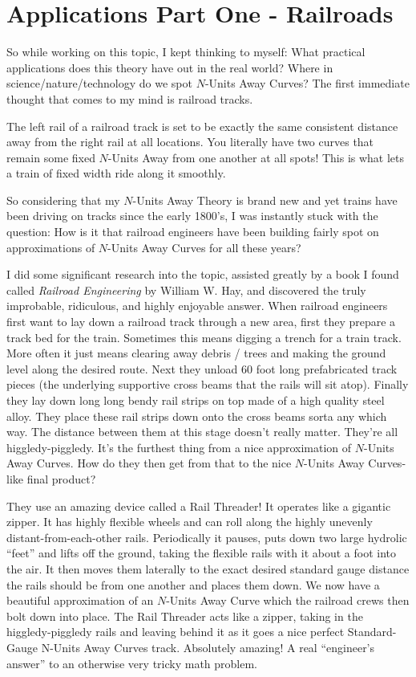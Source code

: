 \section{Applications Part One - Railroads}

So while working on this topic, I kept thinking to myself: What practical applications does this theory have out in the real world? Where in science/nature/technology do we spot $N$-Units Away Curves? The first immediate thought that comes to my mind is railroad tracks.

The left rail of a railroad track is set to be exactly the same consistent distance away from the right rail at all locations. You literally have two curves that remain some fixed $N$-Units Away from one another at all spots! This is what lets a train of fixed width ride along it smoothly.

So considering that my $N$-Units Away Theory is brand new and yet trains have been driving on tracks since the early 1800's, I was instantly stuck with the question: How is it that railroad engineers have been building fairly spot on approximations of $N$-Units Away Curves for all these years?

I did some significant research into the topic, assisted greatly by a book I found called \textit{Railroad Engineering} by William W. Hay, and discovered the truly improbable, ridiculous, and highly enjoyable answer. When railroad engineers first want to lay down a railroad track through a new area, first they prepare a track bed for the train. Sometimes this means digging a trench for a train track. More often it just means clearing away debris / trees and making the ground level along the desired route. Next they unload 60 foot long prefabricated track pieces (the underlying supportive cross beams that the rails will sit atop). Finally they lay down long long bendy rail strips on top made of a high quality steel alloy. They place these rail strips down onto the cross beams sorta any which way. The distance between them at this stage doesn't really matter. They’re all higgledy-piggledy. It’s the furthest thing from a nice approximation of $N$-Units Away Curves. How do they then get from that to the nice $N$-Units Away Curves-like final product?

They use an amazing device called a Rail Threader! It operates like a gigantic zipper. It has highly flexible wheels and can roll along the highly unevenly distant-from-each-other rails. Periodically it pauses, puts down two large hydrolic ``feet'' and lifts off the ground, taking the flexible rails with it about a foot into the air. It then moves them laterally to the exact desired standard gauge distance the rails should be from one another and places them down. We now have a beautiful approximation of an $N$-Units Away Curve which the railroad crews then bolt down into place. The Rail Threader acts like a zipper, taking in the higgledy-piggledy rails and leaving behind it as it goes a nice perfect Standard-Gauge N-Units Away Curves track. Absolutely amazing! A real ``engineer's answer'' to an otherwise very tricky math problem.

